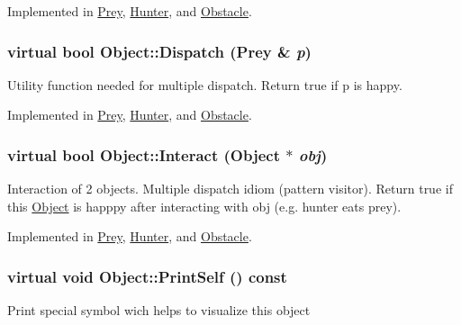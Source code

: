 Implemented in \hyperlink{classPrey_ae1ad92ee4416c74c45a5e4098ba5e327}{Prey}, \hyperlink{classHunter_a3c9a7768f590ef9031b52ae58b5216a6}{Hunter}, and \hyperlink{classObstacle_a10634bf63cc9f11493002c7105fc7e93}{Obstacle}.

\hypertarget{classObject_a70097e3ad4433aec0dd0b938fcedfeca}{
\subsubsection[{Dispatch}]{\setlength{\rightskip}{0pt plus 5cm}virtual bool Object::Dispatch ({\bf Prey} \& {\em p})}}
\label{classObject_a70097e3ad4433aec0dd0b938fcedfeca}
Utility function needed for multiple dispatch. Return true if p is happy. 

Implemented in \hyperlink{classPrey_a1c9491af7144879d4eb0a63e5de4d6b9}{Prey}, \hyperlink{classHunter_ac37d719ac6068a9b3a72650fd4034ad4}{Hunter}, and \hyperlink{classObstacle_a68eae0dce57aa9f5c044d4223211bfab}{Obstacle}.

\hypertarget{classObject_a27d03e80827229de2ce885a0bc1c83c0}{
\subsubsection[{Interact}]{\setlength{\rightskip}{0pt plus 5cm}virtual bool Object::Interact ({\bf Object} $\ast$ {\em obj})}}
\label{classObject_a27d03e80827229de2ce885a0bc1c83c0}
Interaction of 2 objects. Multiple dispatch idiom (pattern visitor). Return true if this \hyperlink{classObject}{Object} is happpy after interacting with obj (e.g. hunter eats prey). 

Implemented in \hyperlink{classPrey_a3f46445d442e33d47edcc94bf5f537b4}{Prey}, \hyperlink{classHunter_aad1bd13407503496a74ae1a6c689e64f}{Hunter}, and \hyperlink{classObstacle_a53bec243dc8a00f23ec61c915aef4c3e}{Obstacle}.

\hypertarget{classObject_a2c63e79dfa8626451b4a04b0b72294eb}{
\subsubsection[{PrintSelf}]{\setlength{\rightskip}{0pt plus 5cm}virtual void Object::PrintSelf () const}}
\label{classObject_a2c63e79dfa8626451b4a04b0b72294eb}
Print special symbol wich helps to visualize this object 

